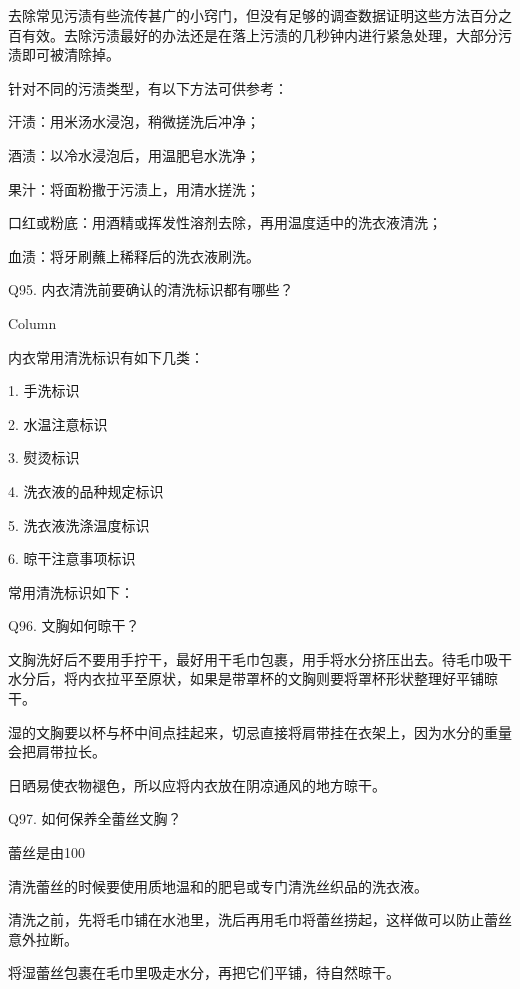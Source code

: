 \documentclass[12pt,UTF8]{ctexbook}
\begin{document}
去除常见污渍有些流传甚广的小窍门，但没有足够的调查数据证明这些方法百分之百有效。去除污渍最好的办法还是在落上污渍的几秒钟内进行紧急处理，大部分污渍即可被清除掉。


针对不同的污渍类型，有以下方法可供参考：

汗渍：用米汤水浸泡，稍微搓洗后冲净；

酒渍：以冷水浸泡后，用温肥皂水洗净；

果汁：将面粉撒于污渍上，用清水搓洗；

口红或粉底：用酒精或挥发性溶剂去除，再用温度适中的洗衣液清洗；

血渍：将牙刷蘸上稀释后的洗衣液刷洗。





Q95. 内衣清洗前要确认的清洗标识都有哪些？



Column

内衣常用清洗标识有如下几类：

1. 手洗标识

2. 水温注意标识

3. 熨烫标识

4. 洗衣液的品种规定标识

5. 洗衣液洗涤温度标识

6. 晾干注意事项标识



常用清洗标识如下：





Q96. 文胸如何晾干？


文胸洗好后不要用手拧干，最好用干毛巾包裹，用手将水分挤压出去。待毛巾吸干水分后，将内衣拉平至原状，如果是带罩杯的文胸则要将罩杯形状整理好平铺晾干。

湿的文胸要以杯与杯中间点挂起来，切忌直接将肩带挂在衣架上，因为水分的重量会把肩带拉长。

日晒易使衣物褪色，所以应将内衣放在阴凉通风的地方晾干。





Q97. 如何保养全蕾丝文胸？


蕾丝是由100%

清洗蕾丝的时候要使用质地温和的肥皂或专门清洗丝织品的洗衣液。

清洗之前，先将毛巾铺在水池里，洗后再用毛巾将蕾丝捞起，这样做可以防止蕾丝意外拉断。

将湿蕾丝包裹在毛巾里吸走水分，再把它们平铺，待自然晾干。
\end{document}
